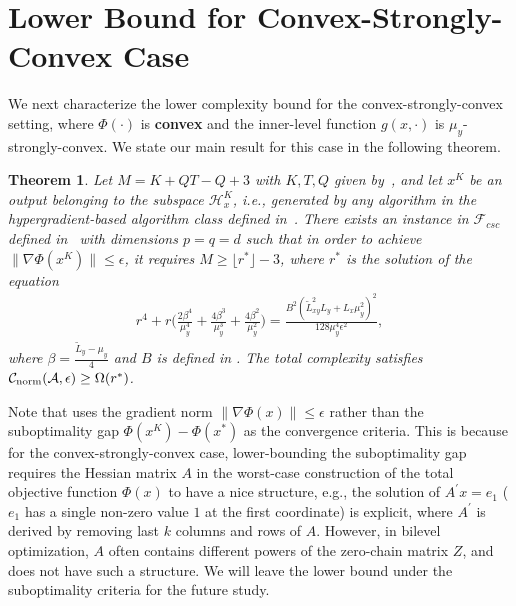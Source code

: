 \documentclass{osudissert96}
\DeclareMathOperator*{\argmin}{arg\,min}
\newtheorem{theorem}{Theorem}
\begin{document}
\section{Lower Bound for Convex-Strongly-Convex Case}
We next characterize the lower complexity bound for the convex-strongly-convex setting, where $\Phi(\cdot)$ is {\bf convex} and the inner-level function $g(x,\cdot)$ is $\mu_y$-strongly-convex.
We state our main result for this case in the following theorem.
\begin{theorem}\label{main:convex}
Let $M = K+QT-Q+3$ with $K, T,Q $ given by~, and let $x^K$ be an output belonging to the  subspace $\mathcal{H}_x^K$, i.e., generated by any algorithm in the hypergradient-based algorithm class
defined in~.  
There exists an instance in $\mathcal{F}_{csc}$ defined in~ with dimensions $p=q=d$ such that in order to achieve $\|\nabla\Phi(x^K)\|\leq \epsilon$, it requires 
$M \geq \lfloor r^*\rfloor -3$, 
 where $r^*$ is the solution of the equation 
 \begin{align}\label{eq:rsoltion}
 r^4 +r \Big(\frac{2\beta^4}{\mu_y^4}+\frac{4\beta^3}{\mu_y^3}+\frac{4\beta^2}{\mu_y^2}\Big) = \frac{B^2(\widetilde L^2_{xy}L_y+L_x\mu_y^2)^2}{128\mu_y^4\epsilon^2},
 \end{align}
 where $\beta=\frac{\widetilde L_y-\mu_y}{4}$ and $B$ is defined in . The total complexity satisfies $\mathcal{C}_{\text{\normalfont norm}}(\mathcal{A},\epsilon)\geq \Omega(r^*)$.
\end{theorem}
Note that  uses the gradient norm $\|\nabla \Phi(x)\|\leq \epsilon$ rather than the suboptimality gap $\Phi(x^K)-\Phi(x^*)$ as the convergence criteria. This is because for the convex-strongly-convex case,  lower-bounding the suboptimality gap requires  the Hessian matrix $A$ in the worst-case construction of the total objective function $\Phi(x)$ to have a nice structure, e.g., the solution of $A^\prime x = e_1$ ($e_1$ has a single non-zero value $1$ at the first coordinate) is explicit, where $A^\prime$ is derived by removing last $k$ columns and rows of $A$.  However, in bilevel optimization, $A$ often contains different powers of the zero-chain matrix $Z$, and does not have such a structure. We will leave the lower bound under the suboptimality criteria for the future study. 
\end{document}
